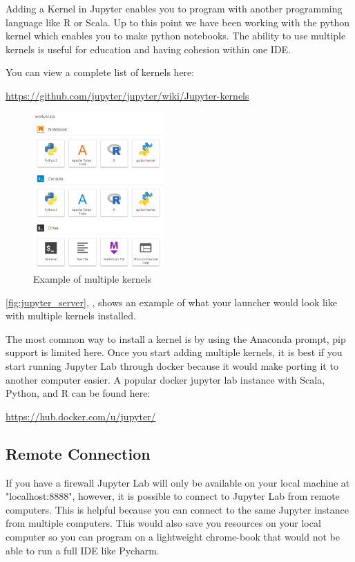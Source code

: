 \documentclass[pdftex,12pt]{artikel3}
\newcommand{\tabfigref}[1]{\autoref{#1}, \nameref{#1},}
\begin{document}
Adding a Kernel in Jupyter enables you to program with another programming language like R or Scala.
Up to this point we have been working with the python kernel which enables you to make python notebooks. The ability to use multiple kernels is useful for education and having cohesion within one IDE.

You can view a complete list of kernels here:

\href{https://github.com/jupyter/jupyter/wiki/Jupyter-kernels}{https://github.com/jupyter/jupyter/wiki/Jupyter-kernels}

\begin{figure}[h!]
    \centering
    \includegraphics[width=50mm]{exampleKernels.PNG}
    \caption{Example of multiple kernels}
    \label{fig:multKernels}
\end{figure}

\tabfigref{fig:jupyter_server} shows an example of what your launcher would look like with multiple kernels installed.

The most common way to install a kernel is by using the Anaconda prompt, pip support is limited here.
Once you start adding multiple kernels, it is best if you start running Jupyter Lab through docker because it would make porting it to another computer easier. A popular docker jupyter lab instance with Scala, Python, and R can be found here:

\href{https://hub.docker.com/u/jupyter/}{https://hub.docker.com/u/jupyter/}

\subsection{Remote Connection}

If you have a firewall Jupyter Lab will only be available on your
local machine at "localhost:8888", however, it is possible to connect to Jupyter Lab from remote computers. 
This is helpful because you can connect to the same Jupyter instance from multiple computers. This would also save you resources on your local computer so you can program on a lightweight chrome-book that would not be able to run a full IDE like Pycharm.
\end{document}
